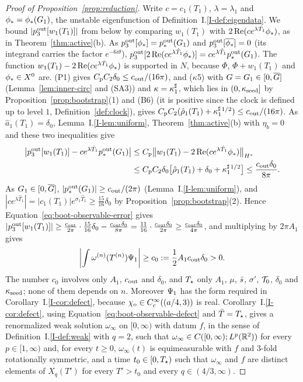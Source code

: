 \begin{proof}[Proof of Proposition~\ref{prop:reduction}]
Write $c=c_1(T_1)$, $\lambda=\lambda_1$ and $\phi_*=\phi_*(G_1)$, the
unstable eigenfunction of Definition~I.\ref{I-def:eigendata}. We bound
$|p^{\mathrm{out}}_3[w_1(T_1)]|$ from below by comparing $w_1(T_1)$ with
$2\Re(ce^{\lambda\hat T_1}\phi_*)$, as in Theorem~\ref{thm:active}\textup{(b)}. As
$p^{\mathrm{out}}_3[\phi_*]=p^{\mathrm{out}}_*(G_1)$ and $p^{\mathrm{out}}_3[\overline{\phi_*}]=0$ (its integrand
carries the factor $e^{-6i\theta}$),
$p^{\mathrm{out}}_3[2\Re(ce^{\lambda\hat T_1}\phi_*)]=ce^{\lambda\hat T_1}p^{\mathrm{out}}_*(G_1)$. The
function $w_1(T_1)-2\Re(ce^{\lambda\hat T_1}\phi_*)$ is supported in $N$, because
$\Phi$, $\Phi+w_1(T_1)$ and $\phi_*\in X^0$ are. (P1) gives
$C_{\mathrm{p}} C_2\delta_0\le c_{\mathrm{out}}/(16\pi)$, and ($\kappa$5) with $G=G_1\in[0,\overline{G}]$
(Lemma~\ref{lem:inner-circ} and (SA3)) and
$\kappa=\kappa^\sharp_1$, which lies in $(0,\kappa_{\mathrm{seed}}]$ by
Proposition~\ref{prop:bootstrap}(1) and (B6) (it is positive since the clock is
defined up to level $1$, Definition~\ref{def:clock}), gives
$C_{\mathrm{p}} C_2(\hat\rho_1(T_1)+\kappa^\sharp_1{}^{1/2})\le c_{\mathrm{out}}/(16\pi)$. As
$\hat a_1(T_1)=\delta_0$, Lemma~I.\ref{I-lem:uniform},
Theorem~\ref{thm:active}(b) with $\eta_b=0$ and these two inequalities give
\begin{equation}
\label{eq:boot-observable-error}
\begin{aligned}
\big|p^{\mathrm{out}}_3[w_1(T_1)]-ce^{\lambda\hat T_1}p^{\mathrm{out}}_*(G_1)\big|
&\le C_{\mathrm{p}}\big\|w_1(T_1)-2\Re(ce^{\lambda\hat T_1}\phi_*)\big\|_{H^s}\\
&\le C_{\mathrm{p}} C_2\delta_0\big[\hat\rho_1(T_1)+\delta_0+\kappa^\sharp_1{}^{1/2}\big]
\le\frac{c_{\mathrm{out}}\delta_0}{8\pi}.
\end{aligned}
\end{equation}
As $G_1\in[0,\overline{G}]$, $|p^{\mathrm{out}}_*(G_1)|\ge c_{\mathrm{out}}/(2\pi)$ (Lemma~I.\ref{I-lem:uniform}), and
$|ce^{\lambda\hat T_1}|=|c_1(T_1)|e^{\sigma_1\hat T_1}\ge\frac{15}{16}\delta_0$
by Proposition~\ref{prop:bootstrap}(2). Hence Equation~\eqref{eq:boot-observable-error} gives
$|p^{\mathrm{out}}_3[w_1(T_1)]|\ge\frac{c_{\mathrm{out}}}{2\pi}\cdot\frac{15}{16}\delta_0-\frac{c_{\mathrm{out}}\delta_0}{8\pi}
=\frac{11}{16}\cdot\frac{c_{\mathrm{out}}\delta_0}{2\pi}\ge\frac{c_{\mathrm{out}}\delta_0}{4\pi}$, and
multiplying by $2\pi A_1$ gives
\begin{equation}
\label{eq:boot-observable-defect}
\left|\int\omega^{(n)}(T^{(n)})\Psi_1\right|
\ge c_0:=\frac12A_1c_{\mathrm{out}}\delta_0>0.
\end{equation}
The number $c_0$
involves only $A_1$, $c_{\mathrm{out}}$ and $\delta_0$, and $T_\star$ only $A_1$, $\mu$,
$\bar s$, $\sigma'$, $\mathcal{T}_0$, $\delta_0$ and $\kappa_{\mathrm{seed}}$; none of them depends on $n$.
Moreover $\Psi_1$ has the form required in
Corollary~I.\ref{I-cor:defect}, because $\chi_{\mathrm{o}}\in C_c^\infty((a/4,3))$ is real.
Corollary~I.\ref{I-cor:defect}, using Equation~\eqref{eq:boot-observable-defect}
and $\bar T=T_\star$, gives a renormalized weak
solution $\omega_\infty$ on $[0,\infty)$ with datum $f$, in the sense of
Definition~I.\ref{I-def:weak} with $q=2$, such that
$\omega_\infty\in C([0,\infty);L^p(\mathbb{R}^2))$ for every $p\in[1,\infty)$ and, for
every $t\ge0$, $\omega_\infty(t)$ is equimeasurable with $f$ and $3$-fold
rotationally symmetric, and a time $t_0\in[0,T_\star)$ such that $\omega_\infty$ and $f$ are
distinct elements of $X_q(T')$ for every $T'>t_0$ and every $q\in(4/3,\infty)$.


\end{proof}

